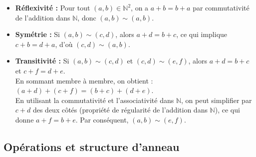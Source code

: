 \documentclass{article}
\begin{document}

\begin{itemize}
    \item \textbf{Réflexivité :} Pour tout $(a, b) \in \mathbb{N}^2$, on a $a + b = b + a$ par commutativité de l'addition dans $\mathbb{N}$, donc $(a, b) \sim (a, b)$.
    \item \textbf{Symétrie :} Si $(a, b) \sim (c, d)$, alors $a + d = b + c$, ce qui implique $c + b = d + a$, d'où $(c, d) \sim (a, b)$.
    \item \textbf{Transitivité :} Si $(a, b) \sim (c, d)$ et $(c, d) \sim (e, f)$, alors $a + d = b + c$ et $c + f = d + e$.\\
    En sommant membre à membre, on obtient : $(a + d) + (c + f) = (b + c) + (d + e)$.\\
    En utilisant la commutativité et l'associativité dans $\mathbb{N}$, on peut simplifier par $c + d$ des deux côtés (propriété de régularité de l'addition dans $\mathbb{N}$), ce qui donne $a + f = b + e$. Par conséquent, $(a, b) \sim (e, f)$.
\end{itemize}




\subsection{Opérations et structure d'anneau}
\end{document}

